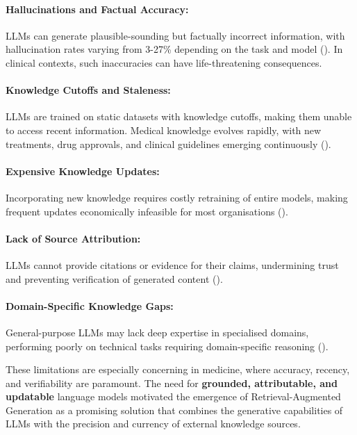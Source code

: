 \paragraph{Hallucinations and Factual Accuracy:} LLMs can generate plausible-sounding but factually incorrect information, with hallucination rates varying from 3-27\% depending on the task and model (\citep{zhang2023sirens}). In clinical contexts, such inaccuracies can have life-threatening consequences.

\paragraph{Knowledge Cutoffs and Staleness:} LLMs are trained on static datasets with knowledge cutoffs, making them unable to access recent information. Medical knowledge evolves rapidly, with new treatments, drug approvals, and clinical guidelines emerging continuously (\citep{rogers2023prompt}).

\paragraph{Expensive Knowledge Updates:} Incorporating new knowledge requires costly retraining of entire models, making frequent updates economically infeasible for most organisations (\citep{zhu2020modifying}).

\paragraph{Lack of Source Attribution:} LLMs cannot provide citations or evidence for their claims, undermining trust and preventing verification of generated content (\citep{rashkin2021measuring}).

\paragraph{Domain-Specific Knowledge Gaps:} General-purpose LLMs may lack deep expertise in specialised domains, performing poorly on technical tasks requiring domain-specific reasoning (\citep{hendrycks2021measuring}).

These limitations are especially concerning in medicine, where accuracy, recency, and verifiability are paramount. The need for \textbf{grounded, attributable, and updatable} language models motivated the emergence of Retrieval-Augmented Generation as a promising solution that combines the generative capabilities of LLMs with the precision and currency of external knowledge sources.

